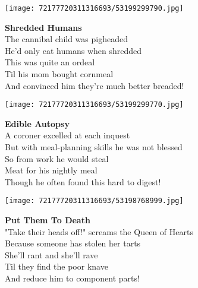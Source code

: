 \documentclass[10pt,letterpaper]{article}
\title{}
\author{}
\date{}
\begin{document}
\begin{center}\texttt{[image: 72177720311316693/53199299790.jpg]}
\end{center}
\begin{center}
\textbf{Shredded Humans}\\
\vskip 0.2in
The cannibal child was pigheaded\\
He'd only eat humans when shredded\\
This was quite an ordeal\\
Til his mom bought cornmeal\\
And convinced him they're much better breaded!\\
\end{center}
\pagebreak

\begin{center}
\texttt{[image: 72177720311316693/53199299770.jpg]}
\end{center}

\begin{center}
\textbf{Edible Autopsy}\\
\vskip 0.2in
A coroner excelled at each inquest\\
But with meal-planning skills he was not blessed\\
So from work he would steal\\
Meat for his nightly meal\\
Though he often found this hard to digest!\\
\end{center}
\pagebreak

\begin{center}
\texttt{[image: 72177720311316693/53198768999.jpg]}
\end{center}

\begin{center}
\textbf{Put Them To Death}\\
\vskip 0.2in
"Take their heads off!" screams the Queen of Hearts\\
Because someone has stolen her tarts\\
She'll rant and she'll rave\\
Til they find the poor knave\\
And reduce him to component parts!\\
\end{center}
\pagebreak
\end{document}
